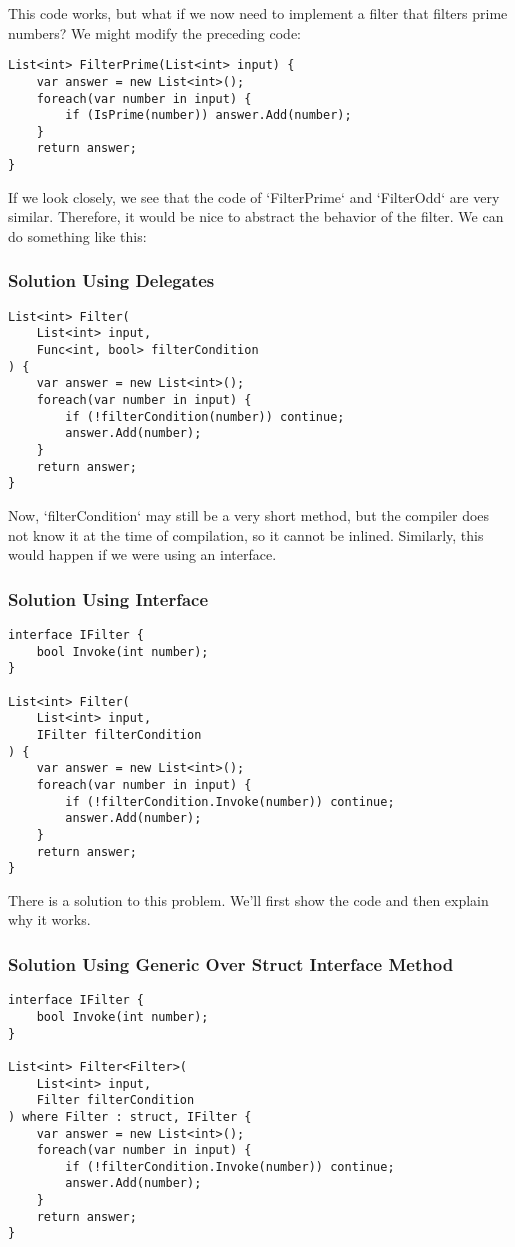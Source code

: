 This code works, but what if we now need to implement a filter that filters prime numbers? We might modify the preceding code:

\begin{lstlisting}
List<int> FilterPrime(List<int> input) {
    var answer = new List<int>();
    foreach(var number in input) {
        if (IsPrime(number)) answer.Add(number);
    }
    return answer;
}
\end{lstlisting}

If we look closely, we see that the code of `FilterPrime` and `FilterOdd` are very similar. Therefore, it would be nice to abstract the behavior of the filter. We can do something like this:

\subsubsection{Solution Using Delegates}
\begin{lstlisting}
List<int> Filter(
    List<int> input, 
    Func<int, bool> filterCondition
) {
    var answer = new List<int>();
    foreach(var number in input) {
        if (!filterCondition(number)) continue;
        answer.Add(number);
    }
    return answer;
}
\end{lstlisting}

Now, `filterCondition` may still be a very short method, but the compiler does not know it at the time of compilation, so it cannot be inlined. Similarly, this would happen if we were using an interface.

\subsubsection{Solution Using Interface}
\begin{lstlisting}
interface IFilter {
    bool Invoke(int number);
}

List<int> Filter(
    List<int> input, 
    IFilter filterCondition
) {
    var answer = new List<int>();
    foreach(var number in input) {
        if (!filterCondition.Invoke(number)) continue;
        answer.Add(number);
    }
    return answer;
}
\end{lstlisting}

There is a solution to this problem. We'll first show the code and then explain why it works.

\subsubsection{Solution Using Generic Over Struct Interface Method}
\begin{lstlisting}
interface IFilter {
    bool Invoke(int number);
}

List<int> Filter<Filter>(
    List<int> input, 
    Filter filterCondition
) where Filter : struct, IFilter {
    var answer = new List<int>();
    foreach(var number in input) {
        if (!filterCondition.Invoke(number)) continue;
        answer.Add(number);
    }
    return answer;
}
\end{lstlisting}

